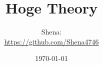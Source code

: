 \documentclass[a4paper,12pt]{article}
\begin{document}
\title{Hoge Theory}
\author{Shena:\\ \url{https://github.com/Shena4746}}
\date{\today}
\maketitle
\end{document}
